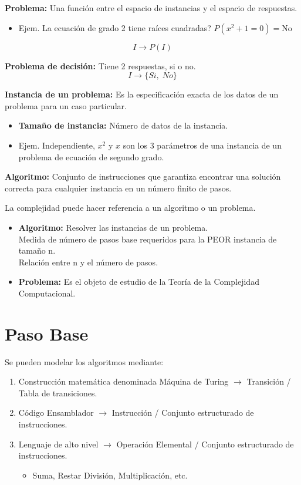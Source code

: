\textbf{Problema:} Una función entre el espacio de instancias y el espacio de respuestas.
\begin{itemize}
  \item Ejem. La ecuación de grado 2 tiene raíces cuadradas? $P(x^2+1=0)=\text{No}$
\end{itemize}
$$I \rightarrow P(I)$$

\textbf{Problema de decisión:} Tiene 2 respuestas, si o no. $$I \rightarrow \{Si,\; No\}$$
\pagebreak

\textbf{Instancia de un problema:} Es la especificación exacta de los datos de un problema para un caso particular.
\begin{itemize}
  \item \textbf{Tamaño de instancia:} Número de datos de la instancia.
  \item Ejem. Independiente, $x^2$ y $x$ son los 3 parámetros de una instancia de un problema de ecuación de segundo grado.
\end{itemize}

\textbf{Algoritmo:} Conjunto de instrucciones que garantiza encontrar una solución correcta para cualquier instancia en un número finito de pasos.

La complejidad puede hacer referencia a un algoritmo o un problema.
\begin{itemize}
  \item \textbf{Algoritmo:} Resolver las instancias de un problema. \\ Medida de número de pasos base requeridos para la PEOR instancia de tamaño n. \\ Relación entre n y el número de pasos.
  \item \textbf{Problema:} Es el objeto de estudio de la Teoría de la Complejidad Computacional.
\end{itemize}

\section{Paso Base}\label{sec:paso-base}
Se pueden modelar los algoritmos mediante:
\begin{enumerate}
    \item Construcción matemática denominada Máquina de Turing $\rightarrow$ Transición / Tabla de transiciones.
  \item Código Ensamblador $\rightarrow$ Instrucción / Conjunto estructurado de instrucciones.
  \item Lenguaje de alto nivel $\rightarrow$ Operación Elemental / Conjunto estructurado de instrucciones.
    \begin{itemize}
      \item Suma, Restar División, Multiplicación, etc.
    \end{itemize}
\end{enumerate}

